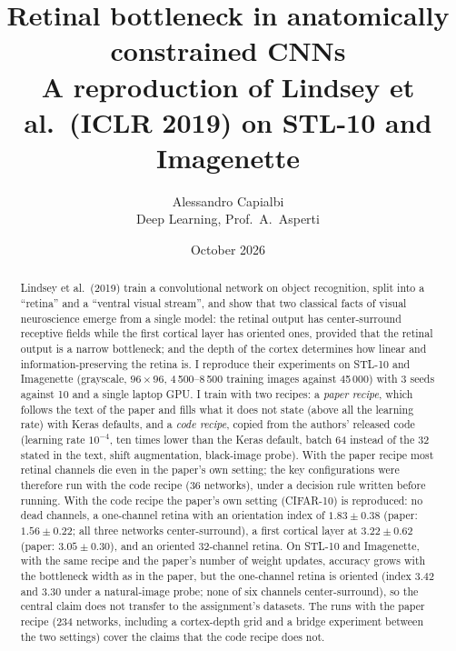 \documentclass[11pt,a4paper]{article}
\title{\textbf{Retinal bottleneck in anatomically constrained CNNs}\\[2pt]
\large A reproduction of Lindsey et al.\ (ICLR 2019) on STL-10 and Imagenette}
\author{Alessandro Capialbi\\ Deep Learning, Prof.\ A.\ Asperti}
\date{October 2026}
\begin{document}
\maketitle

\begin{abstract}
\noindent Lindsey et al.\ (2019) train a convolutional network on object recognition, split into a ``retina'' and a ``ventral visual stream'', and show that two classical facts of visual neuroscience emerge from a single model: the retinal output has center-surround receptive fields while the first cortical layer has oriented ones, provided that the retinal output is a narrow bottleneck; and the depth of the cortex determines how linear and information-preserving the retina is. I reproduce their experiments on STL-10 and Imagenette (grayscale, $96\times96$, 4\,500--8\,500 training images against 45\,000) with 3 seeds against 10 and a single laptop GPU. I train with two recipes: a \emph{paper recipe}, which follows the text of the paper and fills what it does not state (above all the learning rate) with Keras defaults, and a \emph{code recipe}, copied from the authors' released code (learning rate $10^{-4}$, ten times lower than the Keras default, batch 64 instead of the 32 stated in the text, shift augmentation, black-image probe). With the paper recipe most retinal channels die even in the paper's own setting; the key configurations were therefore run with the code recipe (36 networks), under a decision rule written before running. With the code recipe the paper's own setting (CIFAR-10) is reproduced: no dead channels, a one-channel retina with an orientation index of $1.83\pm0.38$ (paper: $1.56\pm0.22$; all three networks center-surround), a first cortical layer at $3.22\pm0.62$ (paper: $3.05\pm0.30$), and an oriented 32-channel retina. On STL-10 and Imagenette, with the same recipe and the paper's number of weight updates, accuracy grows with the bottleneck width as in the paper, but the one-channel retina is oriented (index $3.42$ and $3.30$ under a natural-image probe; none of six channels center-surround), so the central claim does not transfer to the assignment's datasets. The runs with the paper recipe (234 networks, including a cortex-depth grid and a bridge experiment between the two settings) cover the claims that the code recipe does not.
\end{abstract}
\end{document}
